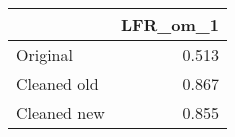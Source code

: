 \begin{tabular}{lr}
\toprule
{} & LFR_om_1 \\
\midrule
Original    &    0.513 \\
Cleaned old &    0.867 \\
Cleaned new &    0.855 \\
\bottomrule
\end{tabular}
